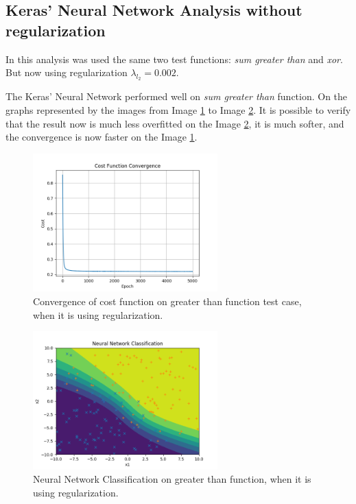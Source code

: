 \documentclass[journal]{IEEEtran}
\begin{document}
\subsection{Keras' Neural Network Analysis without regularization}

In this analysis was used the same two test functions: \textit{sum greater than} and \textit{xor}. But now using regularization $\lambda_{l_2} = 0.002$.

The Keras' Neural Network performed well on \textit{sum greater than} function. On the graphs represented by the images from Image \ref{img:greater_cost_reg} to Image \ref{img:greater_classification_reg}. It is possible to verify that the result now is much less overfitted on the Image \ref{img:greater_classification_reg}, it is much softer, and the convergence is now faster on the Image \ref{img:greater_cost_reg}.

\begin{figure}
  \begin{center}
  \includegraphics[width=2.8in]{./../code/sgz_result/convergence_sgz_l0_002.png}
  \caption{Convergence of cost function on greater than function test case, when it is using regularization.}
  \label{img:greater_cost_reg}
  \end{center}
\end{figure}

\begin{figure}
    \begin{center}
    \includegraphics[width=2.8in]{./../code/sgz_result/nn_classification_sgz_l0_002.png}
    \caption{Neural Network Classification on greater than function, when it is using regularization.}
    \label{img:greater_classification_reg}
    \end{center}
\end{figure}
\end{document}
